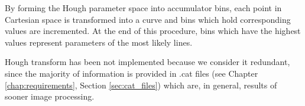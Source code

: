 	By forming the Hough parameter space into accumulator bins, each point in Cartesian space is transformed into a curve and bins which hold corresponding values are incremented. At the end of this procedure, bins which have the highest values represent parameters of the most likely lines.
	
	Hough transform has been not implemented because we consider it redundant, since the majority of information is provided in .cat files (see Chapter \ref{chap:requirements}, Section \ref{sec:cat_files}) which are, in general, results of sooner image processing.